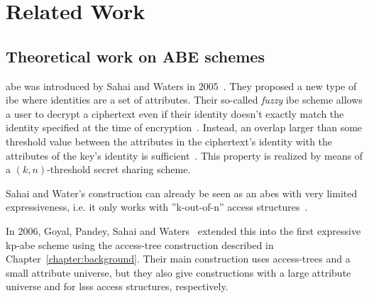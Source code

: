 \chapter{Related Work}



\section{Theoretical work on ABE schemes}
\acrlong{abe} was introduced by Sahai and Waters in 2005~\cite{sahai_fuzzy_2005}.
They proposed a new type of \gls{ibe} where identities are a set of attributes.
Their so-called \emph{fuzzy} \gls{ibe} scheme allows a user to decrypt a ciphertext even if their identity doesn't exactly match the identity specified at the time of encryption~\cite{sahai_fuzzy_2005}.
Instead, an overlap larger than some threshold value between the attributes in the ciphertext's identity with the attributes of the key's identity is sufficient~\cite{sahai_fuzzy_2005}.
This property is realized by means of a $(k, n)$-threshold secret sharing scheme.

Sahai and Water's construction can already be seen as an \acrshort{abes} with very limited expressiveness, i.e. it only works with ''k-out-of-n'' access structures~\cite{goyal_attribute-based_2006}.

In 2006, Goyal, Pandey, Sahai and Waters~\cite{goyal_attribute-based_2006} extended this into the first expressive \acrshort{kp-abe} scheme using the \gls{access-tree} construction described in Chapter~\ref{chapter:background}.
Their main construction uses \glspl{access-tree} and a small attribute universe, but they also give constructions with a large attribute universe and for \gls{lsss} access structures, respectively.

